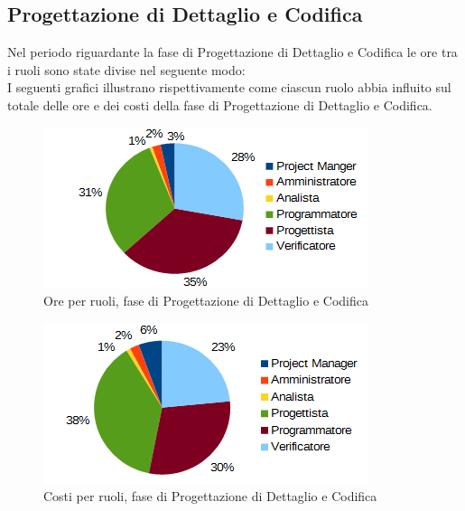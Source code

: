 	\subsection{Progettazione di Dettaglio e Codifica}
	Nel periodo riguardante la fase di Progettazione di Dettaglio e Codifica le ore tra i ruoli sono state divise nel seguente modo: \\
	I seguenti grafici illustrano rispettivamente come ciascun ruolo abbia influito sul totale
delle ore e dei costi della fase di Progettazione di Dettaglio e Codifica.
	\begin{figure}[htbp]
		\centering
		\includegraphics[scale=1]{immagini/grafici/progettazione_dettaglio_codifica-torta.png}
		\caption{Ore per ruoli, fase di Progettazione di Dettaglio e Codifica}
	\end{figure}
	\begin{figure}[htbp]
		\centering
		\includegraphics[scale=1]{immagini/grafici/progettazione_dettaglio_codifica-torta-costo.png}
		\caption{Costi per ruoli, fase di Progettazione di Dettaglio e Codifica}
	\end{figure}
